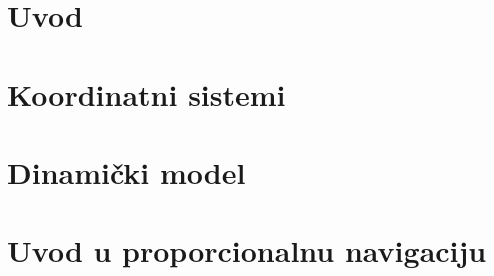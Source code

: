 \documentclass[12pt, twoside]{report}
\begin{document}





\tableofcontents



%
\chapter[]{Uvod}


\chapter{Koordinatni sistemi}



\chapter{Dinamički model}

\chapter{Uvod u proporcionalnu navigaciju}



\nocite{*}
\printbibliography
\end{document}
